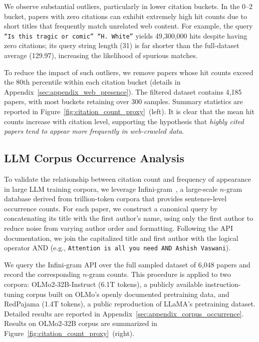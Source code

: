 \documentclass[11pt]{article}
\begin{document}
We observe substantial outliers, particularly in lower citation buckets. In the 0–2 bucket, papers with zero citations can exhibit extremely high hit counts due to short titles that frequently match unrelated web content. For example, the query \texttt{``Is this tragic or comic'' ``H.~White''} yields 49{,}300{,}000 hits despite having zero citations; its query string length (31) is far shorter than the full-dataset average (129.97), increasing the likelihood of spurious matches.

To reduce the impact of such outliers, we remove papers whose hit counts exceed the 80th percentile within each citation bucket (details in Appendix~\ref{sec:appendix_web_presence}). The filtered dataset contains 4,185 papers, with most buckets retaining over 300 samples. Summary statistics are reported in Figure~\ref {fig:citation_count_proxy}~(left).
It is clear that the mean hit counts increase with citation level,
supporting the hypothesis that \emph{highly cited papers tend to appear more frequently in web-crawled data}.

\subsection{LLM Corpus Occurrence Analysis}

To validate the relationship between citation count and frequency of appearance in large LLM training corpora, we leverage Infini-gram~\cite{Liu2024InfiniGram}, a large-scale $n$-gram database derived from trillion-token corpora that provides sentence-level occurrence counts. For each paper, we construct a canonical query by concatenating its title with the first author's name, using only the first author to reduce noise from varying author order and formatting. Following the API documentation, we join the capitalized title and first author with the logical operator AND (e.g., \texttt{Attention is all you need AND Ashish~Vaswani}).

We query the Infini-gram API over the full sampled dataset of 6,048 papers and record the corresponding $n$-gram counts. This procedure is applied to two corpora: OLMo2-32B-Instruct (6.1T tokens), a publicly available instruction-tuning corpus built on OLMo's openly documented pretraining data, and RedPajama (1.4T tokens), a public reproduction of LLaMA's pretraining dataset. Detailed results are reported in Appendix~\ref{sec:appendix_corpus_occurrence}.
Results on OLMo2-32B corpus are summarized in Figure~\ref{fig:citation_count_proxy}~(right).
\end{document}
